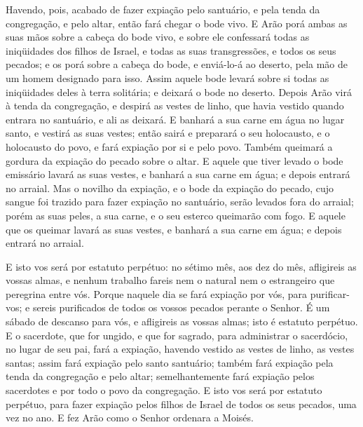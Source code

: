 Havendo, pois, acabado de fazer expiação pelo santuário, e pela
tenda da congregação, e pelo altar, então fará chegar o bode vivo.
E Arão porá ambas as suas mãos sobre a cabeça do bode vivo, e
sobre ele confessará todas as iniqüidades dos filhos de Israel, e
todas as suas transgressões, e todos os seus pecados; e os porá
sobre a cabeça do bode, e enviá-lo-á ao deserto, pela mão de um
homem designado para isso. Assim aquele bode levará sobre si
todas as iniqüidades deles à terra solitária; e deixará o bode no
deserto. Depois Arão virá à tenda da congregação, e despirá
as vestes de linho, que havia vestido quando entrara no santuário, e
ali as deixará. E banhará a sua carne em água no lugar santo,
e vestirá as suas vestes; então sairá e preparará o seu holocausto,
e o holocausto do povo, e fará expiação por si e pelo povo.
Também queimará a gordura da expiação do pecado sobre o
altar. E aquele que tiver levado o bode emissário lavará as
suas vestes, e banhará a sua carne em água; e depois entrará no
arraial. Mas o novilho da expiação, e o bode da expiação do
pecado, cujo sangue foi trazido para fazer expiação no santuário,
serão levados fora do arraial; porém as suas peles, a sua carne, e o
seu esterco queimarão com fogo. E aquele que os queimar
lavará as suas vestes, e banhará a sua carne em água; e depois
entrará no arraial.

E isto vos será por estatuto perpétuo: no sétimo mês, aos dez do
mês, afligireis as vossas almas, e nenhum trabalho fareis nem o
natural nem o estrangeiro que peregrina entre vós. Porque
naquele dia se fará expiação por vós, para purificar-vos; e sereis
purificados de todos os vossos pecados perante o Senhor. É um
sábado de descanso para vós, e afligireis as vossas almas; isto é
estatuto perpétuo. E o sacerdote, que for ungido, e que for
sagrado, para administrar o sacerdócio, no lugar de seu pai, fará a
expiação, havendo vestido as vestes de linho, as vestes santas;
assim fará expiação pelo santo santuário; também fará
expiação pela tenda da congregação e pelo altar; semelhantemente
fará expiação pelos sacerdotes e por todo o povo da congregação.
E isto vos será por estatuto perpétuo, para fazer expiação
pelos filhos de Israel de todos os seus pecados, uma vez no ano. E
fez Arão como o Senhor ordenara a Moisés.

\medskip

